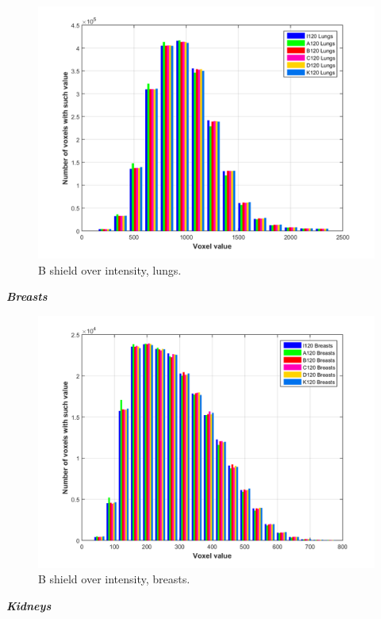 \documentclass[fleqn,10pt]{SelfArx} %
\begin{document}
\begin{figure}[!htb]\centering
\includegraphics[width=\linewidth]{LungsAllShields}
\caption{B shield over intensity, lungs.}
\label{fig:LungsAllShields}
\end{figure}

\textbf{\textit{Breasts}}

\begin{figure}[!htb]\centering
\includegraphics[width=\linewidth]{BreastsAllShields}
\caption{B shield over intensity, breasts.}
\label{fig:BreastsAllShields}
\end{figure}


\textbf{\textit{Kidneys}}
\end{document}
